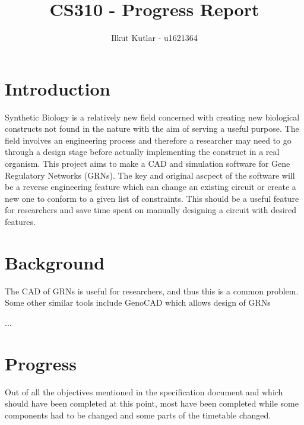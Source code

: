 \documentclass{article}
\author{Ilkut Kutlar - u1621364}
\title{CS310 - Progress Report}
\begin{document}
	\maketitle
	
	\section{Introduction}
	
	Synthetic Biology is a relatively new field concerned with creating new biological constructs not found in the nature with the aim of serving a useful purpose. The field involves an engineering process and therefore a researcher may need to go through a design stage before actually implementing the construct in a real organism. This project aims to make a CAD and simulation software for Gene Regulatory Networks (GRNs). The key and original ascpect of the software will be a reverse engineering feature which can change an existing circuit or create a new one to conform to a given list of constraints. This should be a useful feature for researchers and save time spent on manually designing a circuit with desired features.
	
	\section{Background}
	
	The CAD of GRNs is useful for researchers, and thus this is a common problem. Some other similar tools include GenoCAD which allows design of GRNs
	
	...
	
	
	
	\section{Progress}
	Out of all the objectives mentioned in the specification document and which should have been completed at this point, most have been completed while some components had to be changed and some parts of the timetable changed.
	
	
	
\end{document}
